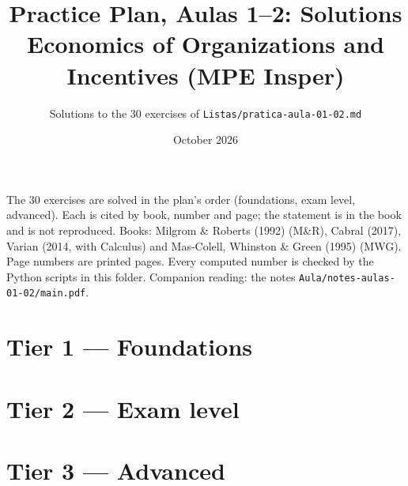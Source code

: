 \documentclass[11pt,a4paper]{article}
\title{\textbf{Practice Plan, Aulas 1--2: Solutions}\\[4pt]
  \large Economics of Organizations and Incentives (MPE Insper)}
\author{Solutions to the 30 exercises of \texttt{Listas/pratica-aula-01-02.md}}
\date{October 2026}
\newcommand{\MR}{M\&R}
\begin{document}
\maketitle
\thispagestyle{empty}

\noindent The 30 exercises are solved in the plan's order (foundations, exam level, advanced).
Each is cited by book, number and page; the statement is in the book and is not reproduced.
Books: Milgrom \& Roberts (1992) (\MR), Cabral (2017), Varian (2014, with Calculus) and
Mas-Colell, Whinston \& Green (1995) (MWG). Page numbers are printed pages. Every computed
number is checked by the Python scripts in this folder. Companion reading: the notes
\texttt{Aula/notes-aulas-01-02/main.pdf}.

\tableofcontents
\newpage

\part*{Tier 1 --- Foundations}











\part*{Tier 2 --- Exam level}














\part*{Tier 3 --- Advanced}







\end{document}
